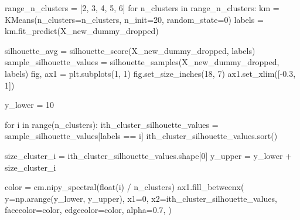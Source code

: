 \documentclass[
  11pt,
  letterpaper,
  DIV=11,
  numbers=noendperiod]{scrartcl}
\newenvironment{Shaded}{\begin{snugshade}}{\end{snugshade}}
\newcommand{\BuiltInTok}[1]{\textcolor[rgb]{0.00,0.23,0.31}{#1}}
\newcommand{\ControlFlowTok}[1]{\textcolor[rgb]{0.00,0.23,0.31}{#1}}
\newcommand{\DecValTok}[1]{\textcolor[rgb]{0.68,0.00,0.00}{#1}}
\newcommand{\FloatTok}[1]{\textcolor[rgb]{0.68,0.00,0.00}{#1}}
\newcommand{\KeywordTok}[1]{\textcolor[rgb]{0.00,0.23,0.31}{#1}}
\newcommand{\NormalTok}[1]{\textcolor[rgb]{0.00,0.23,0.31}{#1}}
\newcommand{\OperatorTok}[1]{\textcolor[rgb]{0.37,0.37,0.37}{#1}}
\begin{document}
\begin{Shaded}
\begin{Highlighting}[]
\NormalTok{range\_n\_clusters }\OperatorTok{=}\NormalTok{ [}\DecValTok{2}\NormalTok{, }\DecValTok{3}\NormalTok{, }\DecValTok{4}\NormalTok{, }\DecValTok{5}\NormalTok{, }\DecValTok{6}\NormalTok{]}
\ControlFlowTok{for}\NormalTok{ n\_clusters }\KeywordTok{in}\NormalTok{ range\_n\_clusters:}
\NormalTok{    km }\OperatorTok{=}\NormalTok{ KMeans(n\_clusters}\OperatorTok{=}\NormalTok{n\_clusters, n\_init}\OperatorTok{=}\DecValTok{20}\NormalTok{, random\_state}\OperatorTok{=}\DecValTok{0}\NormalTok{)}
\NormalTok{    labels }\OperatorTok{=}\NormalTok{ km.fit\_predict(X\_new\_dummy\_dropped)}
    
\NormalTok{    silhouette\_avg }\OperatorTok{=}\NormalTok{ silhouette\_score(X\_new\_dummy\_dropped, labels)}
\NormalTok{    sample\_silhouette\_values }\OperatorTok{=}\NormalTok{ silhouette\_samples(X\_new\_dummy\_dropped, labels)}
\NormalTok{    fig, ax1 }\OperatorTok{=}\NormalTok{ plt.subplots(}\DecValTok{1}\NormalTok{, }\DecValTok{1}\NormalTok{)}
\NormalTok{    fig.set\_size\_inches(}\DecValTok{18}\NormalTok{, }\DecValTok{7}\NormalTok{)}
\NormalTok{    ax1.set\_xlim([}\OperatorTok{{-}}\FloatTok{0.3}\NormalTok{, }\DecValTok{1}\NormalTok{])}

\NormalTok{    y\_lower }\OperatorTok{=} \DecValTok{10}
    
    \ControlFlowTok{for}\NormalTok{ i }\KeywordTok{in} \BuiltInTok{range}\NormalTok{(n\_clusters):}
\NormalTok{        ith\_cluster\_silhouette\_values }\OperatorTok{=}\NormalTok{ sample\_silhouette\_values[labels }\OperatorTok{==}\NormalTok{ i]}
\NormalTok{        ith\_cluster\_silhouette\_values.sort()}

\NormalTok{        size\_cluster\_i }\OperatorTok{=}\NormalTok{ ith\_cluster\_silhouette\_values.shape[}\DecValTok{0}\NormalTok{]}
\NormalTok{        y\_upper }\OperatorTok{=}\NormalTok{ y\_lower }\OperatorTok{+}\NormalTok{ size\_cluster\_i}

\NormalTok{        color }\OperatorTok{=}\NormalTok{ cm.nipy\_spectral(}\BuiltInTok{float}\NormalTok{(i) }\OperatorTok{/}\NormalTok{ n\_clusters)}
\NormalTok{        ax1.fill\_betweenx(}
\NormalTok{            y}\OperatorTok{=}\NormalTok{np.arange(y\_lower, y\_upper),}
\NormalTok{            x1}\OperatorTok{=}\DecValTok{0}\NormalTok{,}
\NormalTok{            x2}\OperatorTok{=}\NormalTok{ith\_cluster\_silhouette\_values,}
\NormalTok{            facecolor}\OperatorTok{=}\NormalTok{color,}
\NormalTok{            edgecolor}\OperatorTok{=}\NormalTok{color,}
\NormalTok{            alpha}\OperatorTok{=}\FloatTok{0.7}\NormalTok{,}
\NormalTok{        )}


\end{Highlighting}
\end{Shaded}
\end{document}
